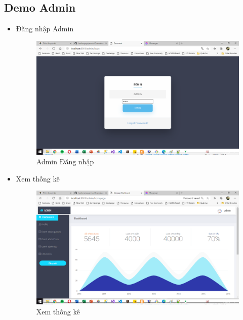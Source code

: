 \documentclass[a4paper, 12pt]{article}
\begin{document}
\subsection{Demo Admin}
\begin{itemize}
	\item Đăng nhập Admin
	\begin{figure}[H]
		\begin{center}
			\includegraphics[scale=0.5]{./image/demo_adminLogin.png}
			\caption{Admin Đăng nhập}
		\end{center}
	\end{figure}

	\item Xem thống kê
	\begin{figure}[H]
		\begin{center}
			\includegraphics[scale=0.5]{./image/demo_adminDashboard.png}
			\caption{Xem thống kê}
		\end{center}
	\end{figure}


\end{itemize}
\end{document}
